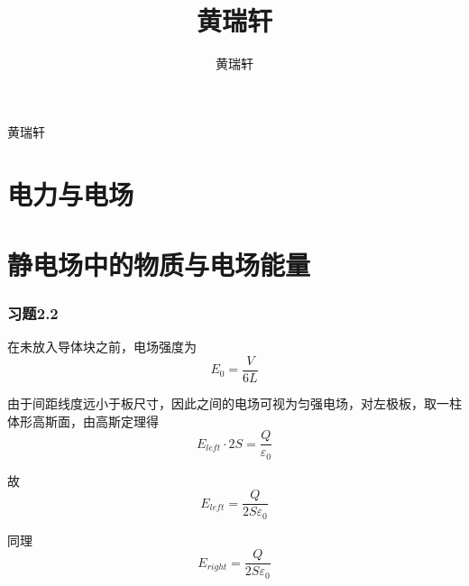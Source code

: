 \documentclass{SCIS2020cn}
\begin{document}
\DOI{}
\ReceiveDate{}
\ReviseDate{}
\AcceptDate{}
\OnlineDate{}

\title{黄瑞轩}{黄瑞轩}


\author[]{黄瑞轩}{}


\address[1]{ }



\AuthorCitation{ }
\enAuthorCitation{ }


\maketitle
\newpage

\part{电力与电场}
\newpage
\part{静电场中的物质与电场能量}
\section{习题2.2}
在未放入导体块之前，电场强度为
\begin{equation}
    E_0=\frac{V}{6L}
\end{equation}

由于间距线度远小于板尺寸，因此之间的电场可视为匀强电场，对左极板，取一柱体形高斯面，由高斯定理得
\begin{equation}
    E_{left}·2S=\frac{Q}{\varepsilon_0}
\end{equation}

故
\begin{equation}
    E_{left}=\frac{Q}{2S\varepsilon_0}
\end{equation}

同理
\begin{equation}
    E_{right}=\frac{Q}{2S\varepsilon_0}
\end{equation}
\end{document}
